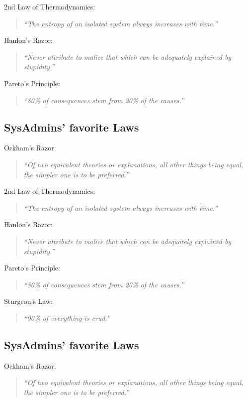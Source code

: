 \documentclass[xga]{xdvislides}
\newcommand{\smallish}{\fontsize{18}{18}\selectfont}
\begin{document}
2nd Law of Thermodynamics:
\begin{quote}
{\em ``The entropy of an isolated system always increases with time.''}
\end{quote}

Hanlon's Razor:
\begin{quote}
{\em ``Never attribute to malice that which can be adequately explained by
stupidity.''}
\end{quote}

Pareto's Principle:
\begin{quote}
{\em ``80\% of consequences stem from 20\% of the causes.''}
\end{quote}
\Normalsize

\subsection{SysAdmins' favorite Laws}
\smallish
Ockham's Razor:
\begin{quote}
{\em ``Of two equivalent theories or explanations, all other things being
equal, the simpler one is to be preferred.''}
\end{quote}

2nd Law of Thermodynamics:
\begin{quote}
{\em ``The entropy of an isolated system always increases with time.''}
\end{quote}

Hanlon's Razor:
\begin{quote}
{\em ``Never attribute to malice that which can be adequately explained by
stupidity.''}
\end{quote}

Pareto's Principle:
\begin{quote}
{\em ``80\% of consequences stem from 20\% of the causes.''}
\end{quote}

Sturgeon's Law:
\begin{quote}
{\em ``90\% of everything is crud.''}
\end{quote}
\Normalsize

\subsection{SysAdmins' favorite Laws}
\smallish
Ockham's Razor:
\begin{quote}
{\em ``Of two equivalent theories or explanations, all other things being
equal, the simpler one is to be preferred.''}
\end{quote}
\end{document}

